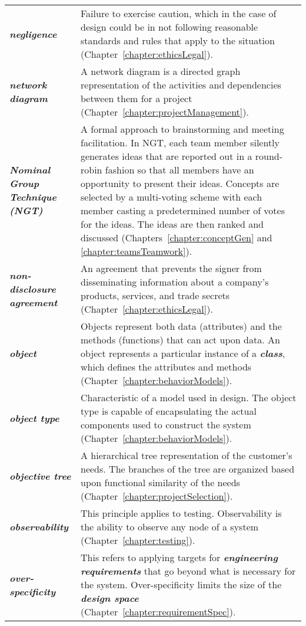 \begin{longtable} { p{3cm} p{11cm}}
\emph{\textbf{negligence}} & Failure to exercise caution, which in the
case of design could be in not following reasonable standards and rules
that apply to the situation (Chapter~\ref{chapter:ethicsLegal}). \B \\
\emph{\textbf{network diagram}} & A network diagram is a directed graph
representation of the activities and dependencies between them for a
project (Chapter~\ref{chapter:projectManagement}). \B \\
\emph{\textbf{Nominal Group Technique (NGT)}} & A formal approach to
brainstorming and meeting facilitation. In NGT, each team member
silently generates ideas that are reported out in a round-robin fashion
so that all members have an opportunity to present their ideas. Concepts
are selected by a multi-voting scheme with each member casting a
predetermined number of votes for the ideas. The ideas are then ranked
and discussed (Chapters~\ref{chapter:conceptGen} and \ref{chapter:teamsTeamwork}). \B \\
\emph{\textbf{non-disclosure agreement}} & An agreement that prevents
the signer from disseminating information about a company's products,
services, and trade secrets (Chapter~\ref{chapter:ethicsLegal}). \B \\
\emph{\textbf{object}} & Objects represent both data (attributes) and
the methods (functions) that can act upon data. An object represents a
particular instance of a \emph{\textbf{class}}, which defines the
attributes and methods (Chapter~\ref{chapter:behaviorModels}). \B \\
\emph{\textbf{object type}} & Characteristic of a model used in design.
The object type is capable of encapsulating the actual components used
to construct the system (Chapter~\ref{chapter:behaviorModels}). \B \\
\emph{\textbf{objective tree}} & A hierarchical tree representation of
the customer's needs. The branches of the tree are organized based upon
functional similarity of the needs (Chapter~\ref{chapter:projectSelection}). \B \\
\emph{\textbf{observability}} & This principle applies to testing.
Observability is the ability to observe any node of a system 
(Chapter~\ref{chapter:testing}). \B \\
\emph{\textbf{over-specificity}} & This refers to applying targets for
\emph{\textbf{engineering requirements}} that go beyond what is
necessary for the system. Over-specificity limits the size of the
\emph{\textbf{design space}} (Chapter~\ref{chapter:requirementSpec}). \B \\

\end{longtable}
